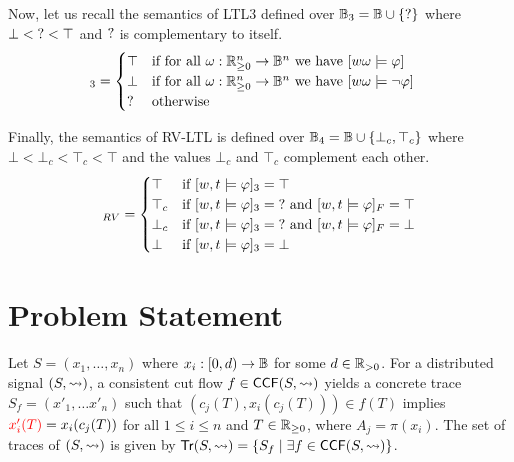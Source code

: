 Now, let us recall the semantics of LTL3 defined over $\mathbb{B}_3 = \mathbb{B} \cup \{\text{?}\}$ where $\bot < \text{?} < \top$ and $\text{?}$ is complementary to itself. %
\begin{align*}
	[w,t \models \varphi]_3 &= \begin{cases}
		\top &\text{if for all } \omega : \R_{\geq 0}^n \to \B^n \text{ we have } [w \omega \models \varphi]\\
		\bot &\text{if for all } \omega : \R_{\geq 0}^n \to \B^n \text{ we have } [w \omega \models \lnot \varphi]\\
		\? &\text{otherwise}\\
	\end{cases}
\end{align*}

Finally, the semantics of RV-LTL is defined over $\mathbb{B}_4 = \mathbb{B} \cup \{\bot_c, \top_c \}$ where $\bot < \bot_c < \top_c < \top$ and the values $\bot_c$ and $\top_c$ complement each other.
\begin{align*}
	[w,t \models \varphi]_{RV} &= \begin{cases}
		\top &\text{if } [w,t \models \varphi]_3 = \top \\
		\top_c &\text{if } [w,t \models \varphi]_3 = \? \text{ and } [w,t \models \varphi]_F = \top \\
		\bot_c &\text{if } [w,t \models \varphi]_3 = \? \text{ and } [w,t \models \varphi]_F = \bot \\
		\bot &\text{if } [w,t \models \varphi]_3 = \bot \\
	\end{cases} \\
\end{align*}	

\section{Problem Statement}

Let $S = (x_1, \ldots, x_n)$ where $x_i : [0,d) \to \mathbb{B}$ for some $d \in \mathbb{R}_{> 0}$.
For a distributed signal $(S,{\rightsquigarrow})$, a consistent cut flow $f \in \mathsf{CCF}(S,{\rightsquigarrow})$ yields a concrete trace $S_f = (x'_1, \ldots x'_n)$ such that $(c_j(T), x_i(c_j(T))) \in f(T)$ implies $\textcolor{red}{x_i'(T)} = x_i(c_j(T))$ for all $1 \leq i \leq n$ and $T \in \mathbb{R}_{\geq 0}$, where $A_j = \pi(x_i)$.
\alert{The set of traces of $(S,{\rightsquigarrow})$ is given by $\tr(S,{\hb}) = \{ S_f \st \exists f \in \CCF(S,{\hb})\}$.}


